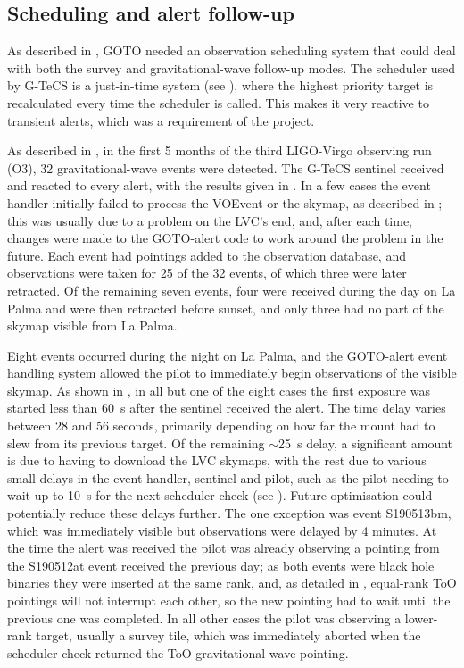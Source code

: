 \subsection{Scheduling and alert follow-up}
\label{sec:gw_results}
\begin{colsection}

As described in , GOTO needed an observation scheduling system that could deal with both the survey and gravitational-wave follow-up modes. The scheduler used by G-TeCS is a just-in-time system (see ), where the highest priority target is recalculated every time the scheduler is called. This makes it very reactive to transient alerts, which was a requirement of the project.

As described in , in the first 5 months of the third LIGO-Virgo observing run (O3), 32 gravitational-wave events were detected. The G-TeCS sentinel received and reacted to every alert, with the results given in . In a few cases the event handler initially failed to process the VOEvent or the skymap, as described in ; this was usually due to a problem on the LVC's end, and, after each time, changes were made to the GOTO-alert code to work around the problem in the future. Each event had pointings added to the observation database, and observations were taken for 25 of the 32 events, of which three were later retracted. Of the remaining seven events, four were received during the day on La Palma and were then retracted before sunset, and only three had no part of the skymap visible from La Palma.

Eight events occurred during the night on La Palma, and the GOTO-alert event handling system allowed the pilot to immediately begin observations of the visible skymap. As shown in , in all but one of the eight cases the first exposure was started less than \SI{60}{\second} after the sentinel received the alert. The time delay varies between 28 and 56 seconds, primarily depending on how far the mount had to slew from its previous target. Of the remaining $\sim$\SI{25}{\second} delay, a significant amount is due to having to download the LVC skymaps, with the rest due to various small delays in the event handler, sentinel and pilot, such as the pilot needing to wait up to \SI{10}{\second} for the next scheduler check (see ). Future optimisation could potentially reduce these delays further. The one exception was event S190513bm, which was immediately visible but observations were delayed by 4 minutes. At the time the alert was received the pilot was already observing a pointing from the S190512at event received the previous day; as both events were black hole binaries they were inserted at the same rank, and, as detailed in , equal-rank ToO pointings will not interrupt each other, so the new pointing had to wait until the previous one was completed. In all other cases the pilot was observing a lower-rank target, usually a survey tile, which was immediately aborted when the scheduler check returned the ToO gravitational-wave pointing.


\end{colsection}
